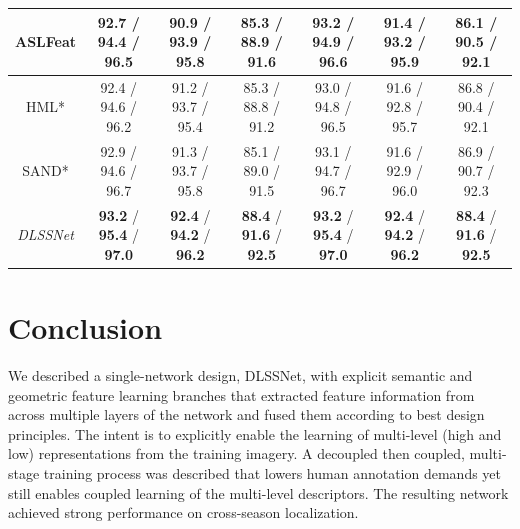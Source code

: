 \begin{table}
\begin{tabular}{|c|ccc|ccc|}
ASLFeat \cite{luo2020aslfeat}                                                                    & 92.7 / 94.4 / 96.5 & 90.9 / 93.9 / 95.8                     & 85.3 / 88.9 / 91.6                                                                               & \textbf{93.2} / 94.9 / 96.6                                                     & 91.4 / 93.2 / 95.9                                                                               & 86.1 / 90.5 / 92.1                                                                               \\ \hline
HML* \cite{fathy2018hierarchical}                                                                       & 92.4 / 94.6 / 96.2 & 91.2 / 93.7 / 95.4                     & 85.3 / 88.8 / 91.2                                                                               & 93.0 / 94.8 / 96.5                                                                               & 91.6 / 92.8 / 95.7                                                                               & 86.8 / 90.4 / 92.1                                                                               \\
SAND* \cite{spencer2019scale}                                                                      & 92.9 / 94.6 / 96.7 & 91.3 / 93.7 / 95.8                     & 85.1 / 89.0 / 91.5                                                                               & 93.1 / 94.7 / 96.7                                                                               & 91.6 / 92.9 / 96.0                                                                               & 86.9 / 90.7 / 92.3                                                                               \\ \hline
{\em DLSSNet}                                                                    & \textbf{93.2} / \textbf{95.4} / \textbf{97.0} & \textbf{92.4} / \textbf{94.2} / \textbf{96.2} & \textbf{88.4} / \textbf{91.6} / \textbf{92.5} & \textbf{93.2} / \textbf{95.4} / \textbf{97.0} & \textbf{92.4} / \textbf{94.2} / \textbf{96.2} & \textbf{88.4} / \textbf{91.6} / \textbf{92.5} \\ \hline
	\end{tabular}
\end{table} 

\section{Conclusion}

We described a single-network design, DLSSNet, with explicit semantic and geometric feature learning branches that extracted feature
information from across multiple layers of the network and fused them according to best design principles. 
The intent is to explicitly enable the learning of multi-level (high and low) representations from the training imagery. 
A decoupled then coupled, multi-stage training process was described that lowers human annotation demands yet still enables coupled learning of the multi-level descriptors. 
The resulting network achieved strong performance on cross-season localization.


